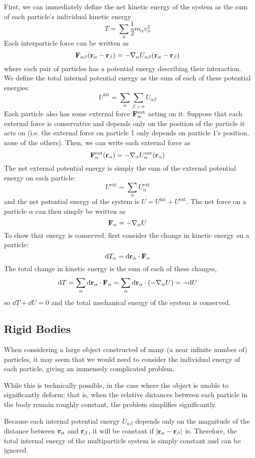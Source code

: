 First, we can immediately define the net kinetic energy of the system as the sum of each particle's individual kinetic energy
\[ T = \sum_\alpha \frac{1}{2}m_\alpha v_\alpha^2\]
Each interparticle force can be written as
\[ \mathbf{F}_{\alpha \beta} (\mathbf{r}_\alpha - \mathbf{r}_\beta) = -\nabla _\alpha U_{\alpha\beta}(\mathbf{r}_\alpha - \mathbf{r}_\beta) \]
where each pair of particles has a potential energy describing their interaction. We define the total internal potential energy as the sum of each of these potential energies:
\[ U^\text{int} = \sum_\alpha \sum _{\beta > \alpha} U_{\alpha\beta} \]
Each particle also has some external force $\mathbf{F}^\text{ext}_\alpha$ acting on it. Suppose that each external force is conservative and depends only on the position of the particle it acts on (i.e. the external force on particle 1 only depends on particle 1's position, none of the others). Then, we can write each external force as
\[ \mathbf{F}_\alpha^\text{ext}(\mathbf{r}_\alpha) = -\nabla_\alpha U_\alpha^\text{ext}(\mathbf{r}_\alpha) \]
The net external potential energy is simply the sum of the external potential energy on each particle:
\[ U^\text{ext} = \sum_\alpha U_\alpha^\text{ext} \]
and the net potential energy of the system is $U = U^\text{int} + U^\text{ext}$. The net force on a particle $\alpha$ can then simply be written as
\[ \mathbf{F}_\alpha = -\nabla_\alpha U\]
To show that energy is conserved, first consider the change in kinetic energy on a particle:
\[ \dd T_\alpha = \dd \mathbf{r}_\alpha \cdot \mathbf{F}_\alpha \]
The total change in kinetic energy is the sum of each of these changes,
\[ \dd T = \sum_\alpha \dd \mathbf{r}_\alpha \cdot \mathbf{F}_\alpha = \sum_\alpha \dd \mathbf{r}_\alpha \cdot (-\nabla_\alpha U) = -\dd U\]
so $\dd T + \dd U = 0$ and the total mechanical energy of the system is conserved. 
\subsection*{Rigid Bodies}
When considering a large object constructed of many (a near infinite number of) particles, it may seem that we would need to consider the individual energy of each particle, giving an immensely complicated problem.

While this is technically possible, in the case where the object is unable to significantly deform; that is, when the relative distances between each particle in the body remain roughly constant, the problem simplifies significantly.

Because each internal potential energy $U_{\alpha\beta}$ depends only on the magnitude of the distance between $\mathbf{r}_\alpha$ and $\mathbf{r}_\beta$, it will be constant if $\abs{\mathbf{r}_\alpha - \mathbf{r}_\beta}$ is. Therefore, the total internal energy of the multiparticle system is simply constant and can be ignored. 

